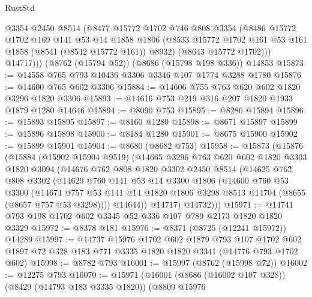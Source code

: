 \begin{lexlean}{RustStd}
\begin{coremodule}
          @3354
          @2450
          @8514
          (@8477
            @15772
            @1702
            @746
            @808
            @3354
            (@8486
              @15772
              @1702
              @169
              @141
              @53
              @14
              @1858
              @1806
              (@8533 @15772 @1702 @161 @53 @161 @1858 (@8541 (@8542 @15772 @161)) @8932)
              (@8643 @15772 @1702)))
          @14717)))
    (@8762 (@15794 @52))
    (@8686 (@15798 @198 @336))
    @14853
@15873 := @14558 @765 @793 @10436 @3306 @3346 @107 @1774 @3288 @1780
@15876 := @14600 @765 @602 @3306
@15884 := @14606 @755 @763 @620 @602 @1820 @3296 @1820 @3306
@15893 := @14616 @753 @219 @316 @207 @1820 @1933 @1879 @1280 @14646
@15894 := @8090 @753
@15895 := @8286 @15894
@15896 := @15893 @15895
@15897 := @8160 @1280
@15898 := @8671 @15897
@15899 := @15896 @15898
@15900 := @8184 @1280
@15901 := @8675 @15900
@15902 := @15899 @15901
@15904 := @8680 (@8682 @753)
@15958 := @15873
    (@15876
      (@15884
        (@15902 @15904 @9519)
        (@14665
          @3296
          @763
          @620
          @602
          @1820
          @3303
          @1820
          @3094
          (@14676
            @762
            @808
            @1820
            @3302
            @2450
            @8514
            (@14625
              @762
              @808
              @3302
              (@14629
                @760
                @141
                @53
                @14
                @3300
                @1806
                (@14600
                  @760
                  @53
                  @3300
                  (@14674
                    @757
                    @53
                    @141
                    @14
                    @1820
                    @1806
                    @3298
                    @8513
                    @14704
                    (@8655 (@8657 @757 @53 @3298))))
                @14644))
            @14717)
          @14732)))
@15971 := @14741 @793 @198 @1702 @602 @3345 @52 @336 @107 @789 @2173 @1820 @1820 @3329
@15972 := @8378 @181
@15976 := @8371 (@8725 (@12241 @15972)) @14289
@15997 := @14737
    @15976
    @1702
    @602
    @1879
    @793
    @107
    @1702
    @602
    @1897
    @72
    @328
    @183
    @771
    @3335
    @1820
    @1820
    @3341
    (@14776 @793 @1702 @602)
@15998 := @8782 @793
@16001 := @15997 (@8762 (@15998 @72))
@16002 := @12275 @793
@16070 := @15971
    (@16001
      (@8686 (@16002 @107 @328))
      (@8429 (@14793 @183 @3335 @1820))
      (@8809
        @15976

\end{coremodule}
\end{lexlean}
